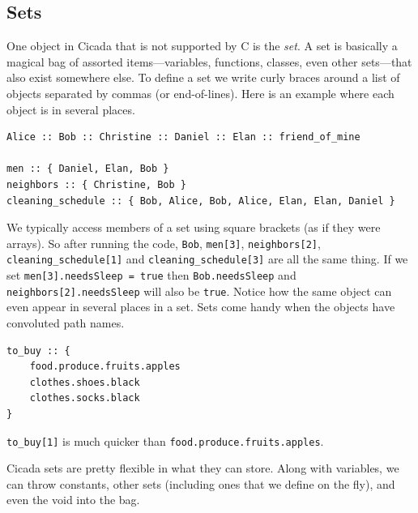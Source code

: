 \documentclass{article}
\newenvironment{code}{
       \begin{list}{}{
               \setlength{\leftmargin}{.4in}
               \setlength{\rightmargin}{0in}
               \setlength{\topsep}{.2in}
       }
       \small
       \item[] }
       { \end{list}   }
\begin{document}







\subsection{Sets} 

One object in Cicada that is not supported by C is the \emph{set}.  A set is basically a magical bag of assorted items---variables, functions, classes, even other sets---that also exist somewhere else.  To define a set we write curly braces around a list of objects separated by commas (or end-of-lines).  Here is an example where each object is in several places.

\begin{code} \begin{verbatim}
Alice :: Bob :: Christine :: Daniel :: Elan :: friend_of_mine

men :: { Daniel, Elan, Bob }
neighbors :: { Christine, Bob }
cleaning_schedule :: { Bob, Alice, Bob, Alice, Elan, Elan, Daniel }
\end{verbatim} \end{code}

\noindent We typically access members of a set using square brackets (as if they were arrays).  So after running the code, \texttt{Bob}, \texttt{men[3]}, \texttt{neighbors[2]}, \texttt{cleaning\_schedule[1]} and \texttt{cleaning\_schedule[3]} are all the same thing.  If we set \verb#men[3].needsSleep = true# then \verb#Bob.needsSleep# and \verb#neighbors[2].needsSleep# will also be \verb#true#.  Notice how the same object can even appear in several places in a set.  Sets come handy when the objects have convoluted path names.

\begin{code} \begin{verbatim}
to_buy :: {
    food.produce.fruits.apples
    clothes.shoes.black
    clothes.socks.black
}
\end{verbatim} \end{code}

\noindent \verb#to_buy[1]# is much quicker than \texttt{food.produce.fruits.apples}.

Cicada sets are pretty flexible in what they can store.  Along with variables, we can throw constants, other sets (including ones that we define on the fly), and even the void into the bag.
\end{document}
